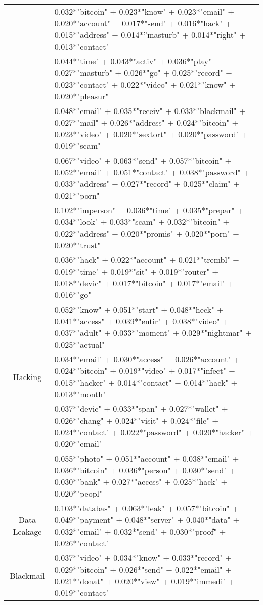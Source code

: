 \begin{table*}[]
\begin{tabularx}{\textwidth}{|c|X|}
&0.032*"bitcoin" + 0.023*"know" + 0.023*"email" + 0.020*"account" + 0.017*"send" + 0.016*"hack" + 0.015*"address" + 0.014*”masturb" + 0.014*"right" + 0.013*"contact"\\ \cline{2-2}
&0.044*"time" + 0.043*"activ" + 0.036*"play" + 0.027*"masturb" + 0.026*"go" + 0.025*"record" + 0.023*"contact" + 0.022*"video" + 0.021*"know" + 0.020*"pleasur" \\ \cline{2-2}
&0.048*"email" + 0.035*"receiv" + 0.033*"blackmail" + 0.027*"mail" + 0.026*"address" + 0.024*"bitcoin" + 0.023*"video" + 0.020*"sextort" + 0.020*"password" + 0.019*"scam" \\ \cline{2-2}

& 0.067*"video" + 0.063*"send" + 0.057*"bitcoin" + 0.052*"email" + 0.051*"contact" + 0.038*"password" + 0.033*"address" + 0.027*"record" + 0.025*"claim" + 0.021*"porn" \\ \cline{2-2}
& 0.102*"imperson" + 0.036*"time" + 0.035*"prepar" + 0.034*"look" + 0.033*"scam" + 0.032*"bitcoin" + 0.022*"address" + 0.020*"promis" + 0.020*"porn" + 0.020*"trust"
\\ \hline
\multirow{5}{*}{Hacking} &0.036*"hack" + 0.022*"account" + 0.021*"trembl" + 0.019*"time" + 0.019*"sit" + 0.019*"router" + 0.018*"devic" + 0.017*"bitcoin" + 0.017*"email" + 0.016*"go" \\ \cline{2-2}
&0.052*"know" + 0.051*"start" + 0.048*"heck" + 0.041*"access" + 0.039*"entir" + 0.038*"video" + 0.037*"adult" + 0.033*"moment" + 0.029*"nightmar" + 0.025*"actual" \\ \cline{2-2}
&0.034*"email" + 0.030*"access" + 0.026*"account" + 0.024*"bitcoin" + 0.019*"video" + 0.017*"infect" + 0.015*"hacker" + 0.014*"contact" + 0.014*"hack" + 0.013*"month" \\ \cline{2-2}
&0.037*"devic" + 0.033*"span" + 0.027*"wallet" + 0.026*"chang" + 0.024*"visit" + 0.024*"file" + 0.024*"contact" + 0.022*"password" + 0.020*"hacker" + 0.020*"email" \\ \cline{2-2}
&0.055*"photo" + 0.051*"account" + 0.038*"email" + 0.036*"bitcoin" + 0.036*"person" + 0.030*"send" + 0.030*"bank" + 0.027*"access" + 0.025*"hack" + 0.020*"peopl"
\\ \hline
\multirow{1}{*}{Data Leakage} & 0.103*"databas" + 0.063*"leak" + 0.057*"bitcoin" + 0.049*"payment" + 0.048*"server" + 0.040*"data" + 0.032*"email" + 0.032*"send" + 0.030*"proof" + 0.026*"contact"
\\ \hline
\multirow{3}{*}{Blackmail} & 0.037*"video" + 0.034*"know" + 0.033*"record" + 0.029*"bitcoin" + 0.026*"send" + 0.022*"email" + 0.021*"donat" + 0.020*"view" + 0.019*"immedi" + 0.019*"contact" \\ \cline{2-2}


\end{tabularx}
\end{table*}
